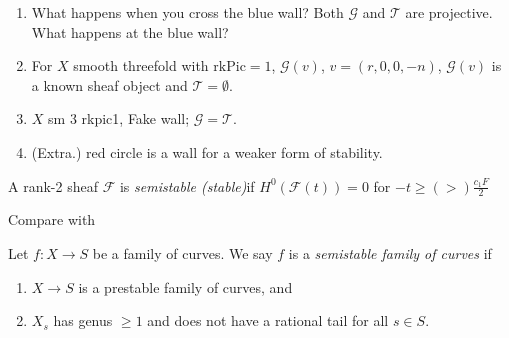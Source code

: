 \begin{enumerate}
$\text{gcd}(\text{ch}_0,\text{ch}_2,\text{ch}_3)=1$, every PT stable object
comes from three conditions (missing).
\item What happens when you cross the blue wall? 
Both $\mathcal{G}$ and $\mathcal{T}$ are projective. What happens at the blue
wall?
\medskip
\item For $X$ smooth threefold with $\text{rk}\text{Pic}=1$, $\mathcal{G}(v)$,
$v=(r,0,0,-n)$, $\mathcal{G}(v)$ is a known sheaf object and
$\mathcal{T}=\emptyset$.
\item $X$ sm 3 rkpic1, Fake wall; $\mathcal{G}=\mathcal{T}$.
\item (Extra.) red circle is a wall for a weaker form of stability.
\end{enumerate}
\begin{definition}
\label{definition-slope-stability}
A rank-2 sheaf $\mathcal{F}$ is {\it semistable (stable)}if
$H^{0}(\mathcal{F}(t))=0$ for $-t \geq(>) \frac{c_1F}{2}$
\end{definition}

Compare with

\begin{definition}
\label{definition-semistable}
Let $f : X \to S$ be a family of curves.
We say $f$ is a {\it semistable family of curves} if
\begin{enumerate}
\item $X \to S$ is a prestable family of curves, and
\item $X_s$ has genus $\geq 1$ and
does not have a rational tail for all $s \in S$.
\end{enumerate}
\end{definition}

